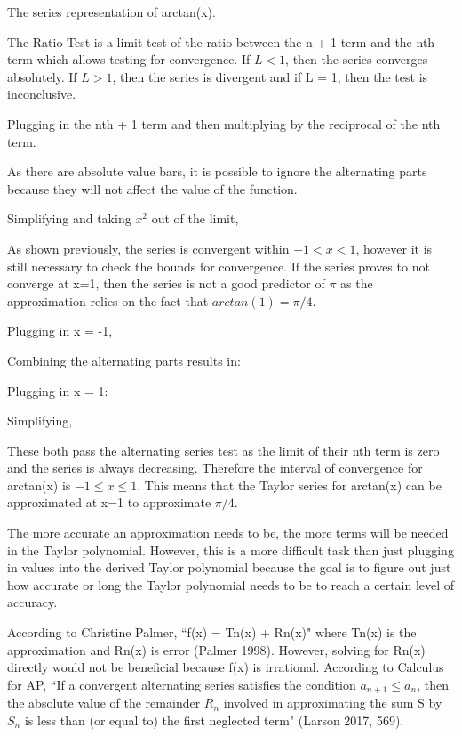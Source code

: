 The series representation of arctan(x).
 
The Ratio Test is a limit test of the ratio between the n + 1 term and the nth term which allows testing for convergence. If \(L < 1\), then the series converges absolutely. If \(L > 1\), then the series is divergent and if L = 1, then the test is inconclusive.

Plugging in the nth + 1 term and then multiplying by the reciprocal of the nth term.

As there are absolute value bars, it is possible to ignore the alternating parts because they will not affect the value of the function.

Simplifying and taking \(x^{2}\) out of the limit,


As shown previously, the series is convergent within \(-1 < x < 1\), however it is still necessary to check the bounds for convergence. If the series proves to not converge at x=1, then the series is not a good predictor of \(\pi\) as the approximation relies on the fact that \(arctan(1) = \pi/4\).


Plugging in x = -1,

Combining the alternating parts results in:

Plugging in x = 1:

Simplifying,

These both pass the alternating series test as the limit of their nth term is zero and the series is always decreasing. Therefore the interval of convergence for arctan(x) is \( -1 \leq x \leq 1 \). This means that the Taylor series for arctan(x) can be approximated at x=1 to approximate \(\pi/4\).

The more accurate an approximation needs to be, the more terms will be needed in the Taylor polynomial. However, this is a more difficult task than just plugging in values into the derived Taylor polynomial because the goal is to figure out just how accurate or long the Taylor polynomial needs to be to reach a certain level of accuracy.

According to Christine Palmer, ``f(x) = Tn(x) + Rn(x)" where Tn(x) is the approximation and Rn(x) is error (Palmer 1998). However, solving for Rn(x) directly would not be beneficial because f(x) is irrational.
According to Calculus for AP, ``If a convergent alternating series satisfies the condition \(a_{n+1} \leq a_{n} \), then the absolute value of the remainder \(R_{n}\) involved in approximating the sum S by \(S_{n}\) is less than (or equal to) the first neglected term" (Larson 2017, 569).

